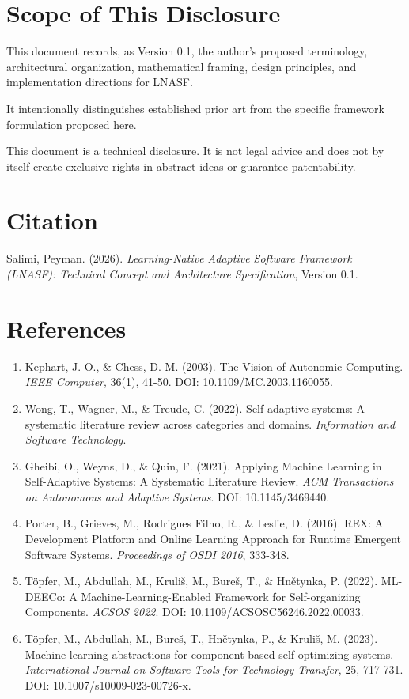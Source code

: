 \documentclass[11pt,a4paper]{article}
\begin{document}
\section{Scope of This Disclosure}
This document records, as Version 0.1, the author's proposed terminology, architectural organization, mathematical framing, design principles, and implementation directions for LNASF.

It intentionally distinguishes established prior art from the specific framework formulation proposed here.

This document is a technical disclosure. It is not legal advice and does not by itself create exclusive rights in abstract ideas or guarantee patentability.

\section{Citation}
Salimi, Peyman. (2026). \textit{Learning-Native Adaptive Software Framework (LNASF): Technical Concept and Architecture Specification}, Version 0.1.

\section{References}
\begin{enumerate}
\item Kephart, J. O., \& Chess, D. M. (2003). The Vision of Autonomic Computing. \textit{IEEE Computer}, 36(1), 41-50. DOI: 10.1109/MC.2003.1160055.
\item Wong, T., Wagner, M., \& Treude, C. (2022). Self-adaptive systems: A systematic literature review across categories and domains. \textit{Information and Software Technology}.
\item Gheibi, O., Weyns, D., \& Quin, F. (2021). Applying Machine Learning in Self-Adaptive Systems: A Systematic Literature Review. \textit{ACM Transactions on Autonomous and Adaptive Systems}. DOI: 10.1145/3469440.
\item Porter, B., Grieves, M., Rodrigues Filho, R., \& Leslie, D. (2016). REX: A Development Platform and Online Learning Approach for Runtime Emergent Software Systems. \textit{Proceedings of OSDI 2016}, 333-348.
\item Töpfer, M., Abdullah, M., Kruliš, M., Bureš, T., \& Hnětynka, P. (2022). ML-DEECo: A Machine-Learning-Enabled Framework for Self-organizing Components. \textit{ACSOS 2022}. DOI: 10.1109/ACSOSC56246.2022.00033.
\item Töpfer, M., Abdullah, M., Bureš, T., Hnětynka, P., \& Kruliš, M. (2023). Machine-learning abstractions for component-based self-optimizing systems. \textit{International Journal on Software Tools for Technology Transfer}, 25, 717-731. DOI: 10.1007/s10009-023-00726-x.
\end{enumerate}
\end{document}
